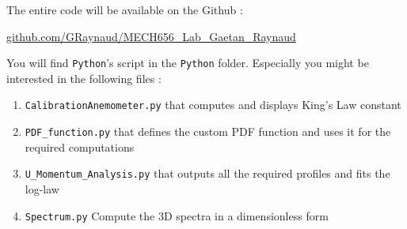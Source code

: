 \documentclass[12pt]{article}
\begin{document}
The entire code will be available on the Github :
\begin{center}
    \href{https://github.com/GRaynaud/MECH656_Lab_Gaetan_Raynaud}{github.com/GRaynaud/MECH656\_Lab\_Gaetan\_Raynaud}

\end{center}

You will find \verb|Python|'s script in the \verb|Python| folder. Especially you might be interested in the following files :
\begin{enumerate}
    \item \verb|CalibrationAnemometer.py| that computes and displays King's Law constant
    \item \verb|PDF_function.py| that defines the custom PDF function and uses it for the required computations
    \item \verb|U_Momentum_Analysis.py| that outputs all the required profiles and fits the log-law
    \item \verb|Spectrum.py| Compute the 3D spectra in a dimensionless form
\end{enumerate}

\newpage


\end{document}
